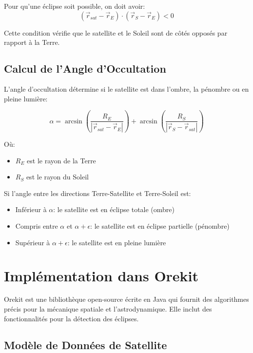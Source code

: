 \documentclass[12pt,a4paper]{article}
\begin{document}
Pour qu'une éclipse soit possible, on doit avoir:
\begin{equation}
(\vec{r}_{sat} - \vec{r}_E) \cdot (\vec{r}_S - \vec{r}_E) < 0
\end{equation}

Cette condition vérifie que le satellite et le Soleil sont de côtés opposés par rapport à la Terre.

\subsection{Calcul de l'Angle d'Occultation}

L'angle d'occultation détermine si le satellite est dans l'ombre, la pénombre ou en pleine lumière:

\begin{equation}
\alpha = \arcsin\left(\frac{R_E}{|\vec{r}_{sat} - \vec{r}_E|}\right) + \arcsin\left(\frac{R_S}{|\vec{r}_S - \vec{r}_{sat}|}\right)
\end{equation}

Où:
\begin{itemize}
    \item $R_E$ est le rayon de la Terre
    \item $R_S$ est le rayon du Soleil
\end{itemize}

Si l'angle entre les directions Terre-Satellite et Terre-Soleil est:
\begin{itemize}
    \item Inférieur à $\alpha$: le satellite est en éclipse totale (ombre)
    \item Compris entre $\alpha$ et $\alpha + \epsilon$: le satellite est en éclipse partielle (pénombre)
    \item Supérieur à $\alpha + \epsilon$: le satellite est en pleine lumière
\end{itemize}

\section{Implémentation dans Orekit}

Orekit est une bibliothèque open-source écrite en Java qui fournit des algorithmes précis pour la mécanique spatiale et l'astrodynamique. Elle inclut des fonctionnalités pour la détection des éclipses.

\subsection{Modèle de Données de Satellite}
\end{document}
